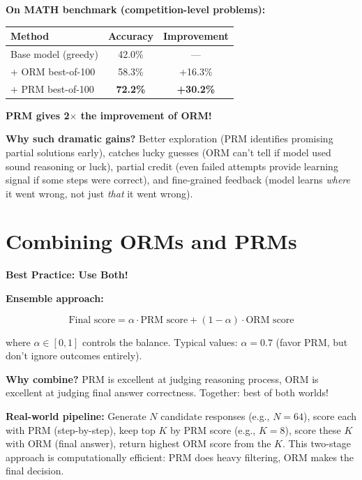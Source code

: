 \begin{chapterenv}
\begin{infobox}
\textbf{On MATH benchmark (competition-level problems):}

\begin{center}
\begin{tabular}{lcc}
\toprule
\textbf{Method} & \textbf{Accuracy} & \textbf{Improvement} \\
\midrule
Base model (greedy) & 42.0\% & --- \\
+ ORM best-of-100 & 58.3\% & +16.3\% \\
+ PRM best-of-100 & \textbf{72.2\%} & \textbf{+30.2\%} \\
\bottomrule
\end{tabular}
\end{center}

\textbf{PRM gives 2$\times$ the improvement of ORM!}

\textbf{Why such dramatic gains?} Better exploration (PRM identifies promising partial solutions early), catches lucky guesses (ORM can't tell if model used sound reasoning or luck), partial credit (even failed attempts provide learning signal if some steps were correct), and fine-grained feedback (model learns \textit{where} it went wrong, not just \textit{that} it went wrong).
\end{infobox}

\section{Combining ORMs and PRMs}

\begin{infobox}
\textbf{Best Practice: Use Both!}

\textbf{Ensemble approach:}

$$\text{Final score} = \alpha \cdot \text{PRM score} + (1-\alpha) \cdot \text{ORM score}$$

where $\alpha \in [0,1]$ controls the balance. Typical values: $\alpha = 0.7$ (favor PRM, but don't ignore outcomes entirely).

\textbf{Why combine?} PRM is excellent at judging reasoning process, ORM is excellent at judging final answer correctness. Together: best of both worlds!

\textbf{Real-world pipeline:} Generate $N$ candidate responses (e.g., $N=64$), score each with PRM (step-by-step), keep top $K$ by PRM score (e.g., $K=8$), score these $K$ with ORM (final answer), return highest ORM score from the $K$. This two-stage approach is computationally efficient: PRM does heavy filtering, ORM makes the final decision.
\end{infobox}

\end{chapterenv}